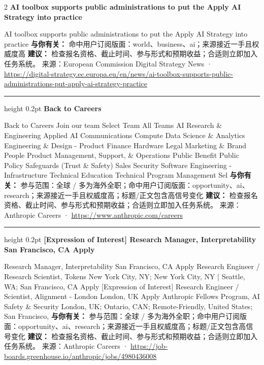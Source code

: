 \documentclass[10.5pt]{ctexart}
\begin{document}
\begin{multicols}{2}
{\large\bfseries AI toolbox supports public administrations to put the Apply AI Strategy into practice}\par
AI toolbox supports public administrations to put the Apply AI Strategy into practice
\textbf{与你有关：} 命中用户订阅版面：world、business、ai；来源接近一手且权威度高
\textbf{建议：} 检查报名资格、截止时间、参与形式和预期收益；合适则立即加入任务系统。
{\footnotesize\color{ormuted} 来源：European Commission Digital Strategy News · \url{https://digital-strategy.ec.europa.eu/en/news/ai-toolbox-supports-public-administrations-put-apply-ai-strategy-practice}}
\vspace{2mm}
\hrule height 0.2pt
\vspace{2mm}
{\large\bfseries Back to Careers}\par
Back to Careers Join our team Select Team All Teams AI Research \& Engineering Applied AI Communications Compute Data Science \& Analytics Engineering \& Design - Product Finance Hardware Legal Marketing \& Brand People Product Management, Support, \& Operations Public Benefit Public Policy Safeguards (Trust \& Safety) Sales Security Software Engineering - Infrastructure Technical Education Technical Program Management Sel
\textbf{与你有关：} 参与范围：全球 / 多为海外全职；命中用户订阅版面：opportunity、ai、research；来源接近一手且权威度高；标题/正文包含高信号变化
\textbf{建议：} 检查报名资格、截止时间、参与形式和预期收益；合适则立即加入任务系统。
{\footnotesize\color{ormuted} 来源：Anthropic Careers · \url{https://www.anthropic.com/careers}}
\vspace{2mm}
\hrule height 0.2pt
\vspace{2mm}
{\large\bfseries [Expression of Interest] Research Manager, Interpretability San Francisco, CA Apply}\par
[Expression of Interest] Research Manager, Interpretability San Francisco, CA Apply Research Engineer / Research Scientist, Tokens New York City, NY; New York City, NY | Seattle, WA; San Francisco, CA Apply [Expression of Interest] Research Engineer / Scientist, Alignment - London London, UK Apply Anthropic Fellows Program, AI Safety \& Security London, UK; Ontario, CAN; Remote-Friendly, United States; San Francisco, 
\textbf{与你有关：} 参与范围：全球 / 多为海外全职；命中用户订阅版面：opportunity、ai、research；来源接近一手且权威度高；标题/正文包含高信号变化
\textbf{建议：} 检查报名资格、截止时间、参与形式和预期收益；合适则立即加入任务系统。
{\footnotesize\color{ormuted} 来源：Anthropic Careers · \url{https://job-boards.greenhouse.io/anthropic/jobs/4980436008}}

\end{multicols}
\end{document}
